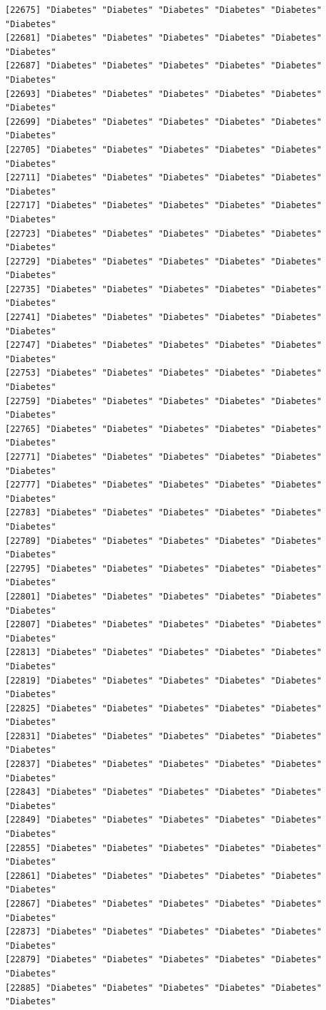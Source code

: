 \documentclass[
  letterpaper,
  DIV=11,
  numbers=noendperiod]{scrartcl}
\begin{document}
\begin{verbatim}
[22675] "Diabetes" "Diabetes" "Diabetes" "Diabetes" "Diabetes" "Diabetes"
[22681] "Diabetes" "Diabetes" "Diabetes" "Diabetes" "Diabetes" "Diabetes"
[22687] "Diabetes" "Diabetes" "Diabetes" "Diabetes" "Diabetes" "Diabetes"
[22693] "Diabetes" "Diabetes" "Diabetes" "Diabetes" "Diabetes" "Diabetes"
[22699] "Diabetes" "Diabetes" "Diabetes" "Diabetes" "Diabetes" "Diabetes"
[22705] "Diabetes" "Diabetes" "Diabetes" "Diabetes" "Diabetes" "Diabetes"
[22711] "Diabetes" "Diabetes" "Diabetes" "Diabetes" "Diabetes" "Diabetes"
[22717] "Diabetes" "Diabetes" "Diabetes" "Diabetes" "Diabetes" "Diabetes"
[22723] "Diabetes" "Diabetes" "Diabetes" "Diabetes" "Diabetes" "Diabetes"
[22729] "Diabetes" "Diabetes" "Diabetes" "Diabetes" "Diabetes" "Diabetes"
[22735] "Diabetes" "Diabetes" "Diabetes" "Diabetes" "Diabetes" "Diabetes"
[22741] "Diabetes" "Diabetes" "Diabetes" "Diabetes" "Diabetes" "Diabetes"
[22747] "Diabetes" "Diabetes" "Diabetes" "Diabetes" "Diabetes" "Diabetes"
[22753] "Diabetes" "Diabetes" "Diabetes" "Diabetes" "Diabetes" "Diabetes"
[22759] "Diabetes" "Diabetes" "Diabetes" "Diabetes" "Diabetes" "Diabetes"
[22765] "Diabetes" "Diabetes" "Diabetes" "Diabetes" "Diabetes" "Diabetes"
[22771] "Diabetes" "Diabetes" "Diabetes" "Diabetes" "Diabetes" "Diabetes"
[22777] "Diabetes" "Diabetes" "Diabetes" "Diabetes" "Diabetes" "Diabetes"
[22783] "Diabetes" "Diabetes" "Diabetes" "Diabetes" "Diabetes" "Diabetes"
[22789] "Diabetes" "Diabetes" "Diabetes" "Diabetes" "Diabetes" "Diabetes"
[22795] "Diabetes" "Diabetes" "Diabetes" "Diabetes" "Diabetes" "Diabetes"
[22801] "Diabetes" "Diabetes" "Diabetes" "Diabetes" "Diabetes" "Diabetes"
[22807] "Diabetes" "Diabetes" "Diabetes" "Diabetes" "Diabetes" "Diabetes"
[22813] "Diabetes" "Diabetes" "Diabetes" "Diabetes" "Diabetes" "Diabetes"
[22819] "Diabetes" "Diabetes" "Diabetes" "Diabetes" "Diabetes" "Diabetes"
[22825] "Diabetes" "Diabetes" "Diabetes" "Diabetes" "Diabetes" "Diabetes"
[22831] "Diabetes" "Diabetes" "Diabetes" "Diabetes" "Diabetes" "Diabetes"
[22837] "Diabetes" "Diabetes" "Diabetes" "Diabetes" "Diabetes" "Diabetes"
[22843] "Diabetes" "Diabetes" "Diabetes" "Diabetes" "Diabetes" "Diabetes"
[22849] "Diabetes" "Diabetes" "Diabetes" "Diabetes" "Diabetes" "Diabetes"
[22855] "Diabetes" "Diabetes" "Diabetes" "Diabetes" "Diabetes" "Diabetes"
[22861] "Diabetes" "Diabetes" "Diabetes" "Diabetes" "Diabetes" "Diabetes"
[22867] "Diabetes" "Diabetes" "Diabetes" "Diabetes" "Diabetes" "Diabetes"
[22873] "Diabetes" "Diabetes" "Diabetes" "Diabetes" "Diabetes" "Diabetes"
[22879] "Diabetes" "Diabetes" "Diabetes" "Diabetes" "Diabetes" "Diabetes"
[22885] "Diabetes" "Diabetes" "Diabetes" "Diabetes" "Diabetes" "Diabetes"

\end{verbatim}
\end{document}
